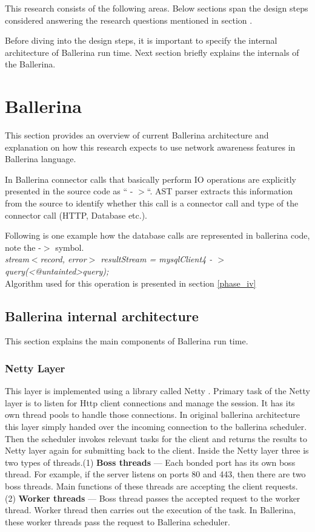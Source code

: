 This research consists of the following areas. Below sections span the design steps considered answering the research questions mentioned in section .

Before diving into the design steps, it is important to specify the internal architecture of Ballerina run time. Next section briefly explains the internals of the Ballerina.



\section{Ballerina}\label{Sec_Ballerina}

This section provides an overview of current Ballerina architecture and explanation on how this research expects to use network awareness features in Ballerina language.  

In Ballerina connector calls that basically perform IO operations are explicitly presented in the source code as “ - $>$“. \acrfull{AST} parser extracts this information from the source to identify whether this call is a connector call and type of the connector call (HTTP, Database etc.).

Following is one example how the database calls are represented in ballerina code, note the -$>$ symbol.\\

\textit{stream$<$record{}, error$>$ resultStream = mysqlClient4 - $>$ query(<@untainted>query);}\\

Algorithm used for this operation is presented in section \ref{phase_iv}


\subsection{Ballerina internal architecture}

This section explains the main components of Ballerina run time.

\subsubsection{Netty Layer}

This layer is implemented using a library called Netty \cite{netty}. Primary task of the Netty layer is to listen for Http client connections and manage the session. It has its own thread pools to handle those connections. In original ballerina architecture this layer simply handed over the incoming connection to the ballerina scheduler. Then the scheduler invokes relevant tasks for the client and returns the results to Netty layer again for submitting back to the client. Inside the Netty layer three is two types of threads.(1) \textbf{Boss threads} — Each bonded port has its own boss thread. For example, if the server listens on ports 80 and 443, then there are two boss threads. Main functions of these threads are accepting the client requests. (2) \textbf{Worker threads} — Boss thread passes the accepted request to the worker thread. Worker thread then carries out the execution of the task. In Ballerina, these worker threads pass the request to Ballerina scheduler.


